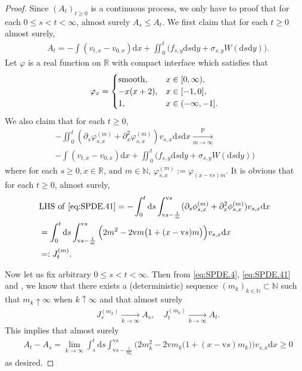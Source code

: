 \documentclass[12pt,a4paper]{amsart}
\numberwithin{equation}{section}
\theoremstyle{plain}
\theoremstyle{remark}
\begin{document}
\begin{proof}
	Since $(A_t)_{t\geq 0}$ is a continuous process, we only have to proof that for each $0\leq s < t < \infty$, almost surely $A_s\leq A_t$.
	We first claim that for each $t\geq 0$ almost surely, 
\begin{align} \label{eq:SPDE.4}
& A_t =  - \int (v_{t,x} - v_{0,x})\mathrm dx + \iint_0^t \big(f_{s,y} \mathrm ds\mathrm dy + \sigma_{s,y} W(\mathrm ds\mathrm dy)\big).
\end{align}
Let $\varphi$ is a real function on $\mathbb R$ with compact interface which satisfies that
\begin{equation}
\varphi_x =
\begin{cases} 
{\rm smooth}, & x \in [0,\infty),
\\ -x(x+2), & x \in [-1,0],
\\ 1, & x \in (-\infty,-1].
\end{cases}
\end{equation}
We also claim that for each $t\geq 0$,
\begin{equation}\label{eq:SPDE.41}
\begin{multlined}
	-  \iint_0^t (\partial_s \varphi^{(m)}_{s,x} + \partial_x^2 \varphi^{(m)}_{s,x}) v_{s,x}\mathrm ds\mathrm dx
	\xrightarrow[m\to \infty]{\mathrm P}
	 \\ - \int (v_{t,x} - v_{0,x})\mathrm dx + \iint_0^t \big(f_{s,y} \mathrm ds\mathrm dy + \sigma_{s,y} W(\mathrm ds\mathrm dy)\big)
\end{multlined}
\end{equation}
	where for each $s\geq 0, x\in \mathbb R$, and $m \in \mathbb N$, $\varphi^{(m)}_{s,x} := \varphi_{(x-\mathrm vs)m}$.  
	It is obvious that for each $t\geq 0$, almost surely, 
\begin{align}
	& {\rm LHS~of~\eqref{eq:SPDE.41}}
	= -\int_0^t \mathrm ds \int_{\mathrm vs - \frac{1}{m}}^{\mathrm vs} (\partial_s \phi^{(m)}_{s,x} + \partial_x^2 \phi^{(m)}_{s,x}) v_{s,x} \mathrm dx 
\\&=\int_0^t \mathrm ds \int_{\mathrm vs - \frac{1}{m}}^{\mathrm vs} \Big(2m^2 - 2\mathrm v m\big(1+ (x-\mathrm vs)m\big) \Big) v_{s,x} \mathrm dx
\\&=: J_t^{(m)}.
\end{align}

Now let us fix arbitrary $0\leq s<  t< \infty$.
Then from \eqref{eq:SPDE.4}, \eqref{eq:SPDE.41} and \cite[Lemma 4.2]{Kallenberg2002Foundations}, we know that there exists a (deterministic) sequence $(m_k)_{k\in \mathbb N} \subset \mathbb N$ such that $m_k \uparrow \infty$ when $k\uparrow \infty$ and that almost surely
\begin{align} 
& J_s^{(m_k)} \xrightarrow[k\to \infty]{} A_s, \quad J_t^{(m_k)} \xrightarrow[k\to \infty]{} A_t.
\end{align}
This implies that almost surely
\begin{align} 
& A_t - A_s  = \lim_{k\to \infty} \int_s^t \mathrm ds \int_{\mathrm vs - \frac{1}{m_k}}^{\mathrm vs} \Big(2m_k^2 - 2\mathrm v m_k\big(1+ (x-\mathrm vs)m_k\big) \Big) v_{s,x} \mathrm dx\geq 0
\end{align}
as desired.


\end{proof}
\end{document}
